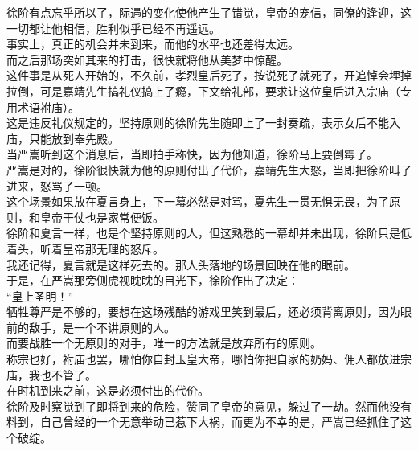 \begin{multicols}{\theparacolNo}
徐阶有点忘乎所以了，际遇的变化使他产生了错觉，皇帝的宠信，同僚的逢迎，这一切都让他相信，胜利似乎已经不再遥远。\\

事实上，真正的机会并未到来，而他的水平也还差得太远。\\

而之后那场突如其来的打击，很快就将他从美梦中惊醒。\\

这件事是从死人开始的，不久前，孝烈皇后死了，按说死了就死了，开追悼会埋掉拉倒，可是嘉靖先生搞礼仪搞上了瘾，下文给礼部，要求让这位皇后进入宗庙（专用术语袝庙）。\\

这是违反礼仪规定的，坚持原则的徐阶先生随即上了一封奏疏，表示女后不能入庙，只能放到奉先殿。\\

当严嵩听到这个消息后，当即拍手称快，因为他知道，徐阶马上要倒霉了。\\

严嵩是对的，徐阶很快就为他的原则付出了代价，嘉靖先生大怒，当即把徐阶叫了进来，怒骂了一顿。\\

这个场景如果放在夏言身上，下一幕必然是对骂，夏先生一贯无惧无畏，为了原则，和皇帝干仗也是家常便饭。\\

徐阶和夏言一样，也是个坚持原则的人，但这熟悉的一幕却并未出现，徐阶只是低着头，听着皇帝那无理的怒斥。\\

我还记得，夏言就是这样死去的。那人头落地的场景回映在他的眼前。\\

于是，在严嵩那旁侧虎视眈眈的目光下，徐阶作出了决定：\\

“皇上圣明！”\\

牺牲尊严是不够的，要想在这场残酷的游戏里笑到最后，还必须背离原则，因为眼前的敌手，是一个不讲原则的人。\\

而要战胜一个无原则的对手，唯一的方法就是放弃所有的原则。\\

称宗也好，袝庙也罢，哪怕你自封玉皇大帝，哪怕你把自家的奶妈、佣人都放进宗庙，我也不管了。\\

在时机到来之前，这是必须付出的代价。\\

徐阶及时察觉到了即将到来的危险，赞同了皇帝的意见，躲过了一劫。然而他没有料到，自己曾经的一个无意举动已惹下大祸，而更为不幸的是，严嵩已经抓住了这个破绽。\\


\end{multicols}

